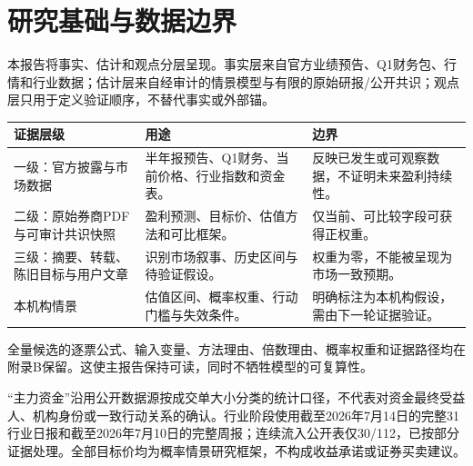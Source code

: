 \chapter{研究基础与数据边界}

本报告将事实、估计和观点分层呈现。事实层来自官方业绩预告、Q1财务包、行情和行业数据；估计层来自经审计的情景模型与有限的原始研报/公开共识；观点层只用于定义验证顺序，不替代事实或外部锚。

\noindent
\begin{tabularx}{\textwidth}{L{2.1cm}L{4.0cm}X}
\toprule
\textbf{证据层级} & \textbf{用途} & \textbf{边界} \\
\midrule
一级：官方披露与市场数据 & 半年报预告、Q1财务、当前价格、行业指数和资金表。 & 反映已发生或可观察数据，不证明未来盈利持续性。 \\
二级：原始券商PDF与可审计共识快照 & 盈利预测、目标价、估值方法和可比框架。 & 仅当前、可比较字段可获得正权重。 \\
三级：摘要、转载、陈旧目标与用户文章 & 识别市场叙事、历史区间与待验证假设。 & 权重为零，不能被呈现为市场一致预期。 \\
本机构情景 & 估值区间、概率权重、行动门槛与失效条件。 & 明确标注为本机构假设，需由下一轮证据验证。 \\
\bottomrule
\end{tabularx}

全量候选的逐票公式、输入变量、方法理由、倍数理由、概率权重和证据路径均在附录B保留。这使主报告保持可读，同时不牺牲模型的可复算性。

\noindent
\begin{disclosurebox}[使用边界]
“主力资金”沿用公开数据源按成交单大小分类的统计口径，不代表对资金最终受益人、机构身份或一致行动关系的确认。行业阶段使用截至2026年7月14日的完整31行业日报和截至2026年7月10日的完整周报；连续流入公开表仅30/112，已按部分证据处理。全部目标价均为概率情景研究框架，不构成收益承诺或证券买卖建议。
\end{disclosurebox}

